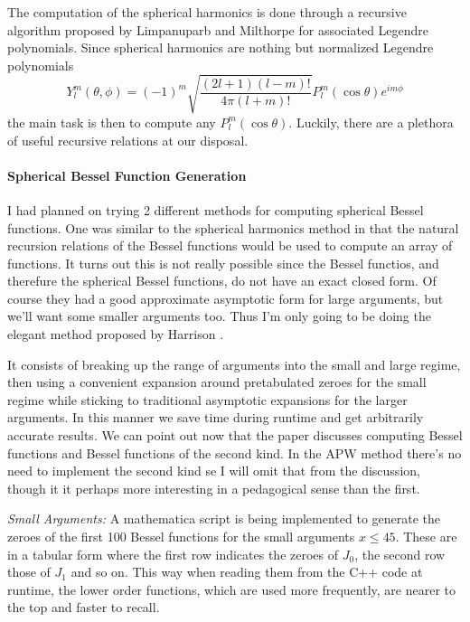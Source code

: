 \documentclass[11pt]{article}
\numberwithin{equation}{section}
\begin{document}
The computation of the spherical harmonics is done through a recursive algorithm proposed by Limpanuparb and Milthorpe for associated Legendre polynomials. Since spherical harmonics are nothing but normalized Legendre polynomials
\begin{equation}
Y_l^m(\theta,\phi) = (-1)^m\sqrt{\frac{(2l+1)(l-m)!}{4\pi(l+m)!}}P_l^m(\cos\theta)e^{im\phi}
\end{equation}
the main task is then to compute any $P_l^m(\cos\theta)$. Luckily, there are a plethora of useful recursive relations at our disposal.

\paragraph{Spherical Bessel Function Generation}
I had planned on trying 2 different methods for computing spherical Bessel functions. One was similar to the spherical harmonics method in that the natural recursion relations of the Bessel functions would be used to compute an array of functions. It turns out this is not really possible since the Bessel functios, and therefure the spherical Bessel functions, do not have an exact closed form. Of course they had a good approximate asymptotic form for large arguments, but we'll want some smaller arguments too. Thus I'm only going to be doing the elegant method proposed by Harrison \cite{spherBessel}.

It consists of breaking up the range of arguments into the small and large regime, then using a convenient expansion around pretabulated zeroes for the small regime while sticking to traditional asymptotic expansions for the larger arguments. In this manner we save time during runtime and get arbitrarily accurate results. We can point out now that the paper discusses computing Bessel functions and Bessel functions of the second kind. In the APW method there's no need to implement the second kind se I will omit that from the discussion, though it it perhaps more interesting in a pedagogical sense than the first.

\textit{Small Arguments:} A mathematica script is being implemented to generate the zeroes of the first 100 Bessel functions for the small arguments $x \leq 45$. These are in a tabular form where the first row indicates the zeroes of $J_0$, the second row those of $J_1$ and so on. This way when reading them from the C++ code at runtime, the lower order functions, which are used more frequently, are nearer to the top and faster to recall.
\end{document}
